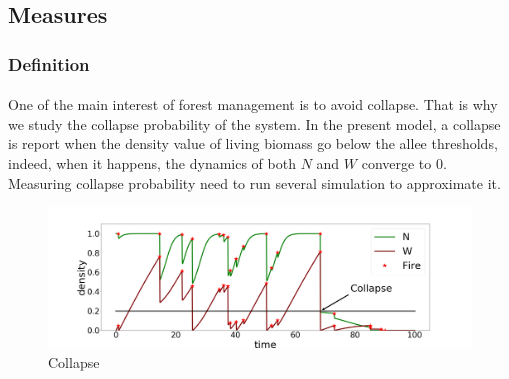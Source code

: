 \documentclass{article}
\begin{document}
\newpage
\subsection{Measures}


\subsubsection{Definition}
\label{collapse_probability}
\paragraph{}
One of the main interest of forest management is to avoid collapse. That is why we study the collapse probability of the system. In the present model, a collapse is report when the density value of living biomass go below the allee thresholds, indeed, when it happens, the dynamics of both $N$ and $W$ converge to $0$. Measuring collapse probability need to run several simulation to approximate it.


\newpage

\begin{figure}[h!]
\centering
\includegraphics[width=12.cm]{time_series_cp_1.png}
\caption{Collapse}
\end{figure}





\label{variability}
\end{document}
